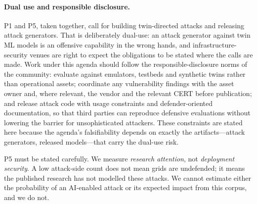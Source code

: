 \documentclass[preprint,12pt]{elsarticle}
\renewcommand{\_}{\plainunderscore\allowbreak}
\begin{document}
\paragraph{Dual use and responsible disclosure.} P1 and P5, taken together, call for
building twin-directed attacks and releasing attack generators. That is deliberately
dual-use: an attack generator against twin ML models is an offensive capability in the
wrong hands, and infrastructure-security venues are right to expect the obligations to be
stated where the calls are made. Work under this agenda should follow the
responsible-disclosure norms of the community: evaluate against emulators, testbeds and
synthetic twins rather than operational assets; coordinate any vulnerability findings with
the asset owner and, where relevant, the vendor and the relevant CERT before publication;
and release attack code with usage constraints and defender-oriented documentation, so
that third parties can reproduce defensive evaluations without lowering the barrier for
unsophisticated attackers. These constraints are stated here because the agenda's
falsifiability depends on exactly the artifacts---attack generators, released
models---that carry the dual-use risk.

P5 must be stated carefully. We measure \emph{research attention}, not \emph{deployment security}.
A low attack-side count does not mean grids are undefended; it means the published research has
not modelled these attacks. We cannot estimate either the probability of an AI-enabled attack or
its expected impact from this corpus, and we do not.
\end{document}
